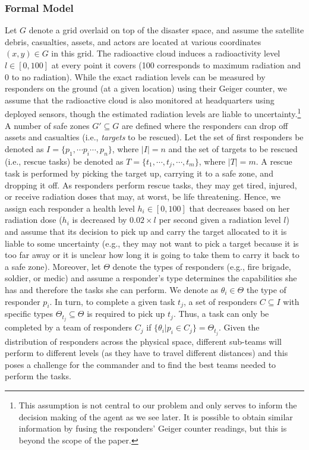 \subsubsection{Formal Model}
\noindent Let $G$ denote a grid overlaid on top of the disaster space, and assume the satellite debris, casualties, assets, and actors are located at various coordinates $(x,y) \in G$ in this grid. The radioactive cloud induces a radioactivity level  $l \in [0,100]$ at every point it covers (100 corresponds to maximum radiation and 0 to no radiation). While the exact radiation levels can be measured by responders on the ground (at a given location) using their Geiger counter, we assume that the radioactive cloud is also monitored at headquarters using deployed sensors, though the estimated radiation levels are liable to uncertainty.\footnote{This assumption is not central to our problem and only serves to inform the decision making of the agent as we see later. It is  possible to obtain similar information by fusing the responders' Geiger counter readings, but this is beyond the scope of the paper.}  A number of safe zones $G' \subseteq G$ are defined where the responders can drop off assets and casualties (i.e., \emph{targets} to be rescued). Let the set of first responders be denoted as $I = \{p_1, \cdots p_i \cdots, p_n\}$, where $|I| = n$ and the set of  targets to be rescued (i.e., rescue tasks) be denoted as  $T = \{t_1,\cdots, t_j, \cdots, t_m\}$, where $|T| = m$. A rescue task is performed by picking the target up, carrying it to a safe zone, and dropping it off.  As responders perform rescue tasks, they may get tired, injured, or receive radiation doses that may, at worst, be life threatening. Hence, we assign each responder  a health level $h_i\in [0,100]$ that decreases based on her radiation dose ($h_i$ is decreased by $0.02 \times l$ per second given a radiation level $l$) and assume that its decision to pick up and carry the target allocated to it is liable to some uncertainty (e.g., they may not want to pick a target because it is too far away or it is unclear how long it is going to take them to  carry it back  to a safe zone).  Moreover, let $\Theta$ denote the types of responders (e.g., fire brigade, soldier, or medic)  and assume a responder's type determines the capabilities  she has and therefore the tasks  she can perform. We denote as $\theta_i \in \Theta$ the type of responder $p_i$. In turn, to complete a given task $t_j$,  a set of responders $C \subseteq I$ with specific types $\Theta_{t_j} \subseteq \Theta$ is required to pick up $t_j$. Thus, a task can only be completed by a team of responders $C_j$ if $\{\theta_i | p_i \in C_j\} = \Theta_{t_j}$. Given the distribution of responders across the physical space, different sub-teams will perform to different levels (as they have to travel different distances) and this poses a challenge for the commander and to find the best teams needed to perform the tasks.

